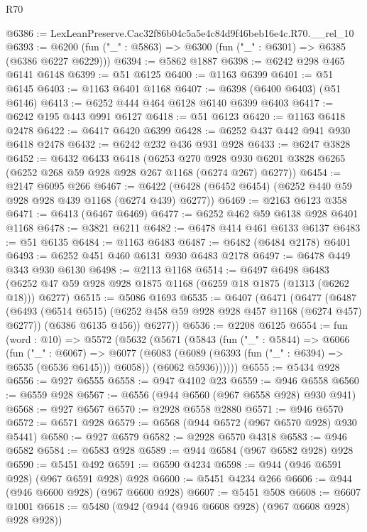 \begin{lexlean}{R70}
\begin{coremodule}
@6386 := LexLeanPreserve.Cac32f86b04c5a5e4c84d9f46beb16e4c.R70.__rel_10
@6393 := @6200 (fun ("_" : @5863) => @6300 (fun ("_" : @6301) => @6385 (@6386 @6227 @6229)))
@6394 := @5862 @1887
@6398 := @6242 @298 @465 @6141 @6148
@6399 := @51 @6125
@6400 := @1163 @6399
@6401 := @51 @6145
@6403 := @1163 @6401 @1168
@6407 := @6398 (@6400 @6403) (@51 @6146)
@6413 := @6252 @444 @464 @6128 @6140 @6399 @6403
@6417 := @6242 @195 @443 @991 @6127
@6418 := @51 @6123
@6420 := @1163 @6418 @2478
@6422 := @6417 @6420 @6399
@6428 := @6252 @437 @442 @941 @930 @6418 @2478
@6432 := @6242 @232 @436 @931 @928
@6433 := @6247 @3828
@6452 := @6432
    @6433
    @6418
    (@6253
      @270
      @928
      @930
      @6201
      @3828
      @6265
      (@6252 @268 @59 @928 @928 @267 @1168 (@6274 @267) @6277))
@6454 := @2147 @6095 @266
@6467 := @6422 (@6428 (@6452 @6454) (@6252 @440 @59 @928 @928 @439 @1168 (@6274 @439) @6277))
@6469 := @2163 @6123 @358
@6471 := @6413 (@6467 @6469)
@6477 := @6252 @462 @59 @6138 @928 @6401 @1168
@6478 := @3821 @6211
@6482 := @6478 @414 @461 @6133 @6137
@6483 := @51 @6135
@6484 := @1163 @6483
@6487 := @6482 (@6484 @2178) @6401
@6493 := @6252 @451 @460 @6131 @930 @6483 @2178
@6497 := @6478 @449 @343 @930 @6130
@6498 := @2113 @1168
@6514 := @6497
    @6498
    @6483
    (@6252 @47 @59 @928 @928 @1875 @1168 (@6259 @18 @1875 (@1313 (@6262 @18))) @6277)
@6515 := @5086 @1693
@6535 := @6407
    (@6471
      (@6477
        (@6487
          (@6493 (@6514 @6515) (@6252 @458 @59 @928 @928 @457 @1168 (@6274 @457) @6277))
          (@6386 @6135 @456))
        @6277))
@6536 := @2208 @6125
@6554 := fun (word : @10) =>
  @5572
    (@5632
      (@5671
        (@5843
          (fun ("_" : @5844) =>
          @6066
            (fun ("_" : @6067) =>
            @6077
              (@6083 (@6089 (@6393 (fun ("_" : @6394) => @6535 (@6536 @6145))) @6058))
              (@6062 @5936))))))
@6555 := @5434 @928
@6556 := @927 @6555
@6558 := @947 @4102 @23
@6559 := @946 @6558
@6560 := @6559 @928
@6567 := @6556 (@944 @6560 (@967 @6558 @928) @930 @941)
@6568 := @927 @6567
@6570 := @2928 @6558 @2880
@6571 := @946 @6570
@6572 := @6571 @928
@6579 := @6568 (@944 @6572 (@967 @6570 @928) @930 @5441)
@6580 := @927 @6579
@6582 := @2928 @6570 @4318
@6583 := @946 @6582
@6584 := @6583 @928
@6589 := @944 @6584 (@967 @6582 @928) @928
@6590 := @5451 @492
@6591 := @6590 @4234
@6598 := @944 (@946 @6591 @928) (@967 @6591 @928) @928
@6600 := @5451 @4234 @266
@6606 := @944 (@946 @6600 @928) (@967 @6600 @928)
@6607 := @5451 @508
@6608 := @6607 @1001
@6618 := @5480 (@942 (@944 (@946 @6608 @928) (@967 @6608 @928) @928 @928))

\end{coremodule}
\end{lexlean}
